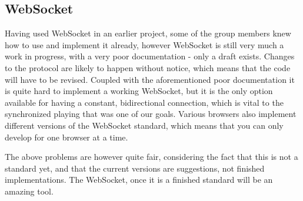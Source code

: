 \subsection{WebSocket}
Having used WebSocket in an earlier project, some of the group members knew how to use and implement it already, however
WebSocket is still very much a work in progress, with a very poor documentation - only a draft exists. Changes to the protocol
are likely to happen without notice, which means that the code will have to be revised. Coupled with the aforementioned poor
documentation it is quite hard to implement a working WebSocket, but it is the only option available for having a constant, bidirectional
connection, which is vital to the synchronized playing that was one of our goals. Various browsers also implement different versions
of the WebSocket standard, which means that you can only develop for one browser at a time. 

The above problems are however quite fair, considering the fact that this is not a standard yet, and that the current versions are suggestions, not finished implementations. The WebSocket, once it is a finished standard will be an amazing tool.